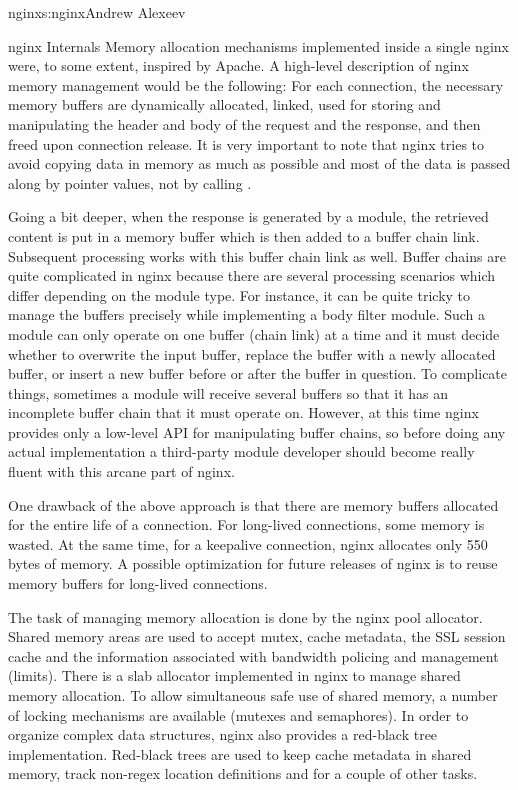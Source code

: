 \begin{aosachapter}{nginx}{s:nginx}{Andrew Alexeev}
\begin{aosasect1}{nginx Internals}
Memory allocation mechanisms implemented inside a single nginx
 were, to some extent, inspired by Apache. A high-level
description of nginx memory management would be the following: For
each connection, the necessary memory buffers are dynamically
allocated, linked, used for storing and manipulating the header and
body of the request and the response, and then freed upon connection
release. It is very important to note that nginx tries to avoid
copying data in memory as much as possible and most of the data is
passed along by pointer values, not by calling .

Going a bit deeper, when the response is generated by a module, the
retrieved content is put in a memory buffer which is then added to a
buffer chain link. Subsequent processing works with this buffer chain
link as well. Buffer chains are quite complicated in nginx because
there are several processing scenarios which differ depending on the module
type. For instance, it can be quite tricky to manage the buffers
precisely while implementing a body filter module. Such a module can
only operate on one buffer (chain link) at a time and it must decide
whether to overwrite the input buffer, replace the buffer with a newly
allocated buffer, or insert a new buffer before or after the buffer in
question. To complicate things, sometimes a module will receive
several buffers so that it has an incomplete buffer chain that it must
operate on. However, at this time nginx provides only a low-level API
for manipulating buffer chains, so before doing any actual
implementation a third-party module developer should become really
fluent with this arcane part of nginx.

One drawback of the above approach is that there are memory buffers
allocated for the entire life of a connection. For long-lived
connections, some memory is wasted. At the same time, for a keepalive
connection, nginx allocates only 550 bytes of memory. A possible
optimization for future releases of nginx is to reuse memory buffers
for long-lived connections.

The task of managing memory allocation is done by the nginx pool
allocator. Shared memory areas are used to accept mutex, cache
metadata, the SSL session cache and the information associated with
bandwidth policing and management (limits). There is a slab allocator
implemented in nginx to manage shared memory allocation. To allow
simultaneous safe use of shared memory, a number of locking mechanisms
are available (mutexes and semaphores). In order to organize complex
data structures, nginx also provides a red-black tree
implementation. Red-black trees are used to keep cache metadata in
shared memory, track non-regex location definitions and for a couple of
other tasks.


\end{aosasect1}
\end{aosachapter}
